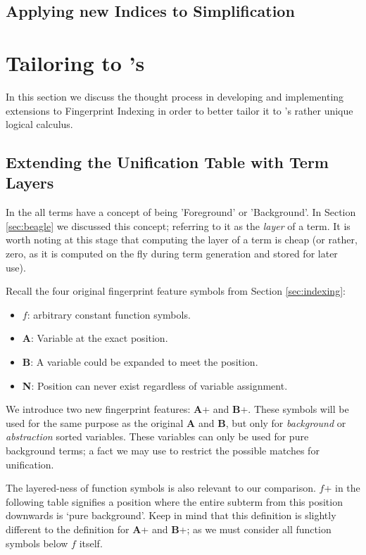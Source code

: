 \subsection{Applying new Indices to Simplification}


\section{Tailoring to \Beagle's \HSWAC}
\label{sec:tailored}

In this section we discuss the thought process in developing and implementing
extensions to Fingerprint Indexing in order to better tailor it to \beagle's
rather unique logical calculus.

\subsection{Extending the Unification Table with Term Layers}

In the {\HSWAC} all terms have 
a concept of being 'Foreground' or 'Background'. In Section \ref{sec:beagle} we
discussed this concept; referring to it as the \emph{layer} of a term. It is
worth noting at this stage that computing the layer of a term is cheap (or rather,
zero, as it is computed on the fly during term generation and stored for later use).

Recall the four original fingerprint feature symbols from Section \ref{sec:indexing}:
\begin{itemize}
\item $f$: arbitrary constant function symbols.
\item \textbf{A}: Variable at the exact position.
\item \textbf{B}: A variable could be expanded to meet the position.
\item \textbf{N}: Position can never exist regardless of variable assignment.
\end{itemize}
We introduce two new fingerprint features: \textbf{A}+ and \textbf{B}+.
These symbols will be used for the same purpose as the original \textbf{A} and \textbf{B}, but
only for \emph{background} or \emph{abstraction} sorted variables. These variables
can only be used for pure background terms; a fact we may use to restrict the possible
matches for unification.

The layered-ness of function symbols is also relevant to our comparison.
$f$+ in the following table signifies a position where the entire subterm from this position downwards
is `pure background'. Keep in mind that this definition is slightly different
to the definition for \textbf{A}+ and \textbf{B}+; as we must consider all function
symbols below $f$ itself.

